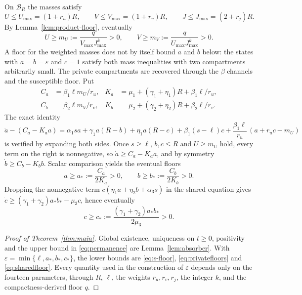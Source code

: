 \documentclass[11pt,a4paper]{article}
\theoremstyle{plain}
\theoremstyle{definition}
\theoremstyle{remark}
\newcommand{\eps}{\varepsilon}
\newcommand{\cB}{\mathcal B}
\begin{document}
On $\cB_R$ the masses satisfy
\[
 U\le U_{\max}=(1+r_u)R,\qquad V\le V_{\max}=(1+r_v)R,\qquad J\le J_{\max}=(2+r_j)R .
\]
By Lemma~\ref{lem:product-floor}, eventually
\begin{equation}\label{eq:massfloors}
 U\ge m_U:=\frac{q}{V_{\max}J_{\max}^k}>0,\qquad V\ge m_V:=\frac{q}{U_{\max}J_{\max}^k}>0 .
\end{equation}
A floor for the weighted masses does not by itself bound $a$ and $b$ below: the states with $a=b=\eps$ and $c=1$ satisfy both mass inequalities with two compartments arbitrarily small. The private compartments are recovered through the $\beta$ channels and the susceptible floor. Put
\begin{equation}\label{eq:private-constants}
\begin{aligned}
 C_a&=\beta_1\ell m_U/r_u,& K_a&=\mu_1+(\gamma_1+\eta_1)R+\beta_1\ell/r_u,\\
 C_b&=\beta_2\ell m_V/r_v,& K_b&=\mu_2+(\gamma_2+\eta_2)R+\beta_2\ell/r_v .
\end{aligned}
\end{equation}
The exact identity
\begin{equation}\label{eq:forcing}
 \dot a-(C_a-K_aa)=\alpha_1sa+\gamma_1a(R-b)+\eta_1a(R-c)+\beta_1(s-\ell)c+\frac{\beta_1\ell}{r_u}\,(a+r_uc-m_U)
\end{equation}
is verified by expanding both sides. Once $s\ge\ell$, $b,c\le R$ and $U\ge m_U$ hold, every term on the right is nonnegative, so $\dot a\ge C_a-K_aa$, and by symmetry $\dot b\ge C_b-K_bb$. Scalar comparison yields the eventual floors
\begin{equation}\label{eq:privatefloors}
 a\ge a_*:=\frac{C_a}{2K_a}>0,\qquad b\ge b_*:=\frac{C_b}{2K_b}>0 .
\end{equation}
Dropping the nonnegative term $c(\eta_1a+\eta_2b+\alpha_3s)$ in the shared equation gives $\dot c\ge(\gamma_1+\gamma_2)a_*b_*-\mu_3c$, hence eventually
\begin{equation}\label{eq:sharedfloor}
 c\ge c_*:=\frac{(\gamma_1+\gamma_2)a_*b_*}{2\mu_3}>0 .
\end{equation}

\begin{proof}[Proof of Theorem~\ref{thm:main}]
Global existence, uniqueness on $t\ge0$, positivity and the upper bound in \eqref{eq:permanence} are Lemma~\ref{lem:absorber}. With $\eps=\min\{\ell,a_*,b_*,c_*\}$, the lower bounds are \eqref{eq:s-floor}, \eqref{eq:privatefloors} and \eqref{eq:sharedfloor}. Every quantity used in the construction of $\eps$ depends only on the fourteen parameters, through $R$, $\ell$, the weights $r_u,r_v,r_j$, the integer $k$, and the compactness-derived floor $q$.
\end{proof}
\end{document}
